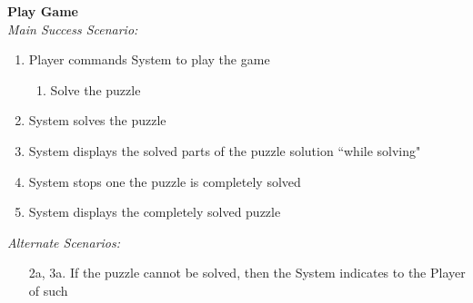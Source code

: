 \documentclass[letterpaper]{article}
\begin{document}
\noindent
\textbf{Play Game}\\
\textit{Main Success Scenario:}
\begin{enumerate}
\item Player commands System to play the game
\begin{enumerate}
\item Solve the puzzle
\end{enumerate}
\item System solves the puzzle
\item System displays the solved parts of the puzzle solution
``while solving"
\item System stops one the puzzle is completely solved
\item System displays the completely solved puzzle
\end{enumerate}
\textit{Alternate Scenarios:}
\begin{enumerate}
\item[2a, 3a.] If the puzzle cannot be solved, then the System
indicates to the Player of such
\end{enumerate}
\end{document}
